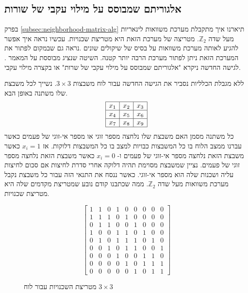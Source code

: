 \documentclass[12pt,leqno]{article}
\theoremstyle{theoremdd}
\begin{document}
\subsection{אלגוריתם שמבוסס על מילוי עקבי של שורות}
בפרק 
\ref{subsec:neighborhood-matrix-alg}
תיארנו איך מתקבלת מערכת משוואות לינאריות מעל שדה
$\mathbb{Z}_2$.
מטריצה של מערכת הזאת היא מטריצת שכנויות.
עכשיו נראה איך אפשר להגיע לאותה מערכת משוואות
על בסיס של שיקולים שונים .נראה גם שבמקום לפתור
את המערכת הזאת ניתן לפתור מערכת הרבה יותר קטנה. 
השיטה שנציג מבוססת על
המאמר 
\cite{B1}.
לגישה החדשה ניקרא
"אלגוריתם שמבוסס על מילוי עקבי של שרות"
או בקצרה מילוי עקבי.

ללא מגבלת הכלליות נסביר את הגישה החדשה עבור לוח משבצות 
$3\times 3$.
נשייך לכל משבצת שלו משתנה באופן הבא.
\[ \begin{array}{|c|c|c|}
\hline
x_1 & x_2  & x_3  \\
\hline 
x_4 & x_5 & x_6 \\
\hline 
x_7 & x_8 & x_9 \\
\hline
\end{array}  \]
כל משתנה מסמן האם משבצת שלו
 נלחצה מספר זוגי או מספר אי-זוגי של פעמים כאשר עברנו ממצב
 הלוח בו כל המשבצות כבויות למצב בו כל המשבצות דלוקות. אז 
$x_i=1$
כאשר משבצת הזאת נלחצה מספר אי-זוגי של פעמים ו-
$x_i=0$
כאשר משבצת הזאת נלחצה מספר זוגי של פעמים. נציין שמשבצת מסוימת תהיה דלוקה אחרי סדרת לחיצות אם סכום לחיצות עליה ושכנות שלה הוא מספר אי-זוגי. כאשר ננסח את התנאי הזה עבור כל משבצת נקבל מערכת משוואות מעל שדה 
$\mathbb{Z}_2$.
ממה שכתבנו קודם נובע שמטריצת מקדמים שלה היא מטריצת שכנויות.
\begin{figure}[ht]
    \caption{מטריצת השכנויות עבור לוח 
    $3 \times 3 $}
    \label{fig:neighborhood-matrix-for-3x3}
    \[
    \begin{bmatrix}
    1 & 1 & 0 & 1 & 0 & 0 & 0 & 0 & 0 \\
    1 & 1 & 1 & 0 & 1 & 0 & 0 & 0 & 0 \\
    0 & 1 & 1 & 0 & 0 & 1 & 0 & 0 & 0 \\
    1 & 0 & 0 & 1 & 1 & 0 & 1 & 0 & 0 \\
    0 & 1 & 0 & 1 & 1 & 1 & 0 & 1 & 0 \\
    0 & 0 & 1 & 0 & 1 & 1 & 0 & 0 & 1 \\
    0 & 0 & 0 & 1 & 0 & 0 & 1 & 1 & 0 \\
    0 & 0 & 0 & 0 & 1 & 0 & 1 & 1 & 1 \\
    0 & 0 & 0 & 0 & 0 & 1 & 0 & 1 & 1 
    \end{bmatrix}
    \]
\end{figure}
\end{document}
